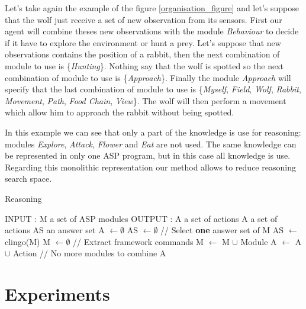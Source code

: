 \documentclass{aamas2012}
\begin{document}
	Let's take again the example of the figure \ref{organisation_figure} and let's suppose that the wolf just receive a set of new observation from its sensors.
	First our agent will combine theses new observations with the module \textit{Behaviour} to decide if it have to explore the environment or hunt a prey.
	Let's suppose that new observations contains the position of a rabbit, then the next combination of module to use is \{\textit{Hunting}\}.
	Nothing say that the wolf is spotted so the next combination of module to use is \{\textit{Approach}\}.
	Finally the module \textit{Approach} will specify that the last combination of module to use is 
	\{\textit{Myself}, \textit{Field}, \textit{Wolf}, \textit{Rabbit}, \textit{Movement}, \textit{Path}, \textit{Food Chain}, \textit{View}\}.
	The wolf will then perform a movement which allow him to approach the rabbit without being spotted.
	
	In this example we can see that only a part of the knowledge is use for reasoning: 
	modules \textit{Explore}, \textit{Attack}, \textit{Flower} and \textit{Eat} are not used.
	The same knowledge can be represented in only one ASP program, but in this case all knowledge is use.
	Regarding this monolithic representation our method allows to reduce reasoning search space.

	\begin{algorithm}
	\caption{Reasoning}
	\label{framework_algorithm}
	\begin{algorithmic}[1]
	\STATE INPUT : M a set of ASP modules
	\STATE OUTPUT : A a set of actions
	\newline
	\STATE A a set of actions
	\STATE AS an answer set
	\newline
	\STATE A $\leftarrow \emptyset$
	\STATE AS $\leftarrow \emptyset$
	\newline
	\REPEAT
		\STATE // Select \textbf{one} answer set of M
		\STATE AS $\leftarrow$ clingo(M)
		\STATE M $\leftarrow \emptyset$ 
		\newline
		\STATE // Extract framework commands
				\STATE M $\leftarrow$ M $\cup$ Module
			\ENDIF
				\STATE A $\leftarrow$ A $\cup$ Action
			\ENDIF
		\ENDFOR
	 // No more modules to combine
	\newline
	\RETURN A
	\end{algorithmic}
	\end{algorithm}

\section{Experiments}
\end{document}
